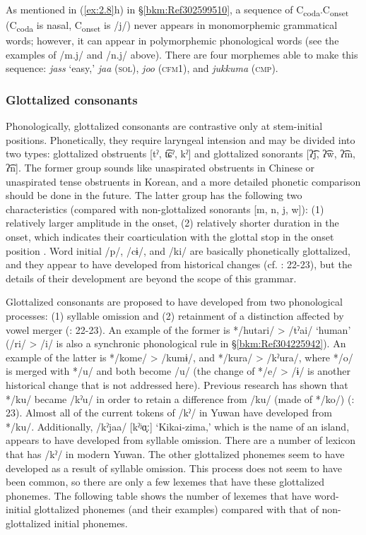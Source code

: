 As mentioned in (\ref{ex:2.8}h) in §\ref{bkm:Ref302599510}, a sequence of C\textsubscript{coda}.C\textsubscript{onset} (C\textsubscript{coda} is nasal, C\textsubscript{onset} is /j/) never appears in monomorphemic grammatical words; however, it can appear in polymorphemic phonological words (see the examples of /m.j/ and /n.j/ above). There are four morphemes able to make this sequence: \textit{jass} ‘easy,’ \textit{jaa} (\textsc{sol}), \textit{joo} (\textsc{cfm}1), and \textit{jukkuma} (\textsc{cmp}).

\subsubsection{Glottalized consonants}
\label{bkm:Ref347180773}\hypertarget{RefHeadingToc395696974}{}
Phonologically, glottalized consonants are contrastive only at stem-initial positions. Phonetically, they require laryngeal intension and may be divided into two types: glottalized obstruents [tˀ, t͡ɕˀ, kˀ] and glottalized sonorants [ʔ͡j, ʔ͡w, ʔ͡m, ʔ͡n]. The former group sounds like unaspirated obstruents in Chinese or unaspirated tense obstruents in Korean, and a more detailed phonetic comparison should be done in the future. The latter group has the following two characteristics (compared with non-glottalized sonorants [m, n, j, w]): (1) relatively larger amplitude in the onset, (2) relatively shorter duration in the onset, which indicates their coarticulation with the glottal stop in the onset position \citep{NiinagaEtAl2011}. Word initial /p/, /cɨ/, and /ki/ are basically phonetically glottalized, and they appear to have developed from historical changes (cf. \citealt{HirayamaEtAl1966}: 22-23), but the details of their development are beyond the scope of this grammar.

Glottalized consonants are proposed to have developed from two phonological processes: (1) syllable omission and (2) retainment of a distinction affected by vowel merger (\citealt{HirayamaEtAl1966}: 22-23). An example of the former is */hutari/ > /tˀai/ ‘human’ (/ri/ > /i/ is also a synchronic phonological rule in §\ref{bkm:Ref304225942}). An example of the latter is */kome/ > /kumɨ/, and */kura/ > /kˀura/, where */o/ is merged with */u/ and both become /u/ (the change of */e/ > /ɨ/ is another historical change that is not addressed here). Previous research has shown that */ku/ became /kˀu/ in order to retain a difference from /ku/ (made of */ko/) (\citealt{HirayamaEtAl1966}: 23). Almost all of the current tokens of /kˀ/ in Yuwan have developed from */ku/. Additionally, /kˀjaa/ [kˀʲɑ̟ː] ‘Kikai-zima,’ which is the name of an island, appears to have developed from syllable omission. There are a number of lexicon that has /kˀ/ in modern Yuwan. The other glottalized phonemes seem to have developed as a result of syllable omission. This process does not seem to have been common, so there are only a few lexemes that have these glottalized phonemes. The following table shows the number of lexemes that have word-initial glottalized phonemes (and their examples) compared with that of non-glottalized initial phonemes.

